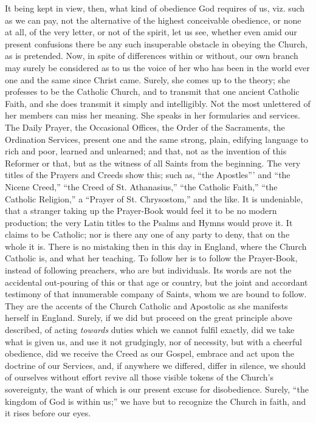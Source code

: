 It being kept in view, then, what kind of obedience God requires of
us, viz. such as we can pay, not the alternative of the highest
conceivable obedience, or none at all, of the very letter, or not of
the spirit, let us see, whether even amid our present confusions there
be any such insuperable obstacle in obeying the Church, as is
pretended. Now, in spite of differences within or without, our own
branch may surely be considered as to us the voice of her who has been
in the world ever one and the same since Christ came. Surely, she
comes up to the theory; she professes to be the Catholic Church, and
to transmit that one ancient Catholic Faith, and she does transmit it
simply and intelligibly. Not the most unlettered of her members can
miss her meaning. She speaks in her formularies and services. The
Daily Prayer, the Occasional Offices, the Order of the Sacraments, the
Ordination Services, present one and the same strong, plain, edifying
language to rich and poor, learned and unlearned; and that, not as the
invention of this Reformer or that, but as the witness of all Saints
from the beginning. The very titles of the Prayers and Creeds show
this; such as, ``the Apostles''' and ``the Nicene
Creed,'' ``the Creed of St. Athanasius,'' ``the
Catholic Faith,'' ``the Catholic Religion,'' a
``Prayer of St. Chrysostom,'' and the like. It is undeniable,
that a stranger taking up the Prayer-Book would feel it to be no
modern production; the very Latin titles to the Psalms and Hymns would
prove it. It claims to be Catholic; nor is there any one of any party
to deny, that on the whole it is. There is no mistaking then in this
day in England, where the Church Catholic is, and what her teaching.
To follow her is to follow the Prayer-Book, instead of following
preachers, who are but individuals. Its words are not the
accidental out-pouring of this or that age or country, but the joint
and accordant testimony of that innumerable company of Saints, whom we
are bound to follow. They are the accents of the Church Catholic and
Apostolic as she manifests herself in England. Surely, if we did but
proceed on the great principle above described, of acting \emph{towards}
duties which we cannot fulfil exactly, did we take what is given us,
and use it not grudgingly, nor of necessity, but with a cheerful
obedience, did we receive the Creed as our Gospel, embrace and act
upon the doctrine of our Services, and, if anywhere we differed,
differ in silence, we should of ourselves without effort revive all
those visible tokens of the Church's sovereignty, the want of which is
our present excuse for disobedience. Surely, ``the kingdom of God
is within us;'' we have but to recognize the Church in faith, and
it rises before our eyes.

